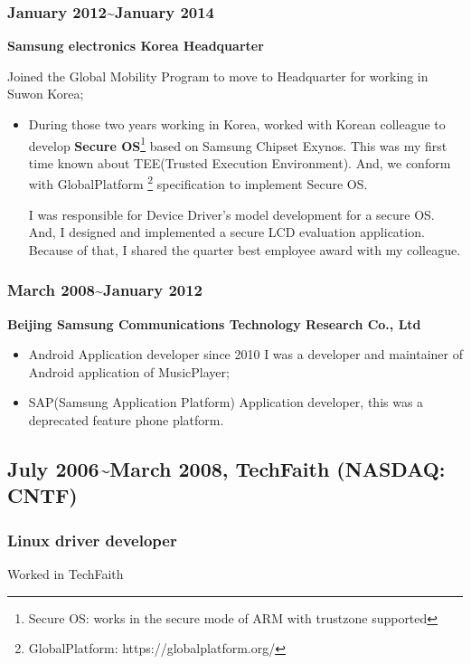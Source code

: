 \documentclass{article}
\begin{document}
\subsubsection{January 2012\~{}January 2014}
\textbf{Samsung electronics Korea Headquarter}

Joined the Global Mobility Program to move to Headquarter for working in Suwon Korea;

\begin{itemize}
\item{}During those two years working in Korea, worked with Korean colleague to develop
\textbf{Secure OS}\footnote{Secure OS: works in the secure mode of ARM with trustzone supported} based on Samsung Chipset Exynos.
This was my first time known about TEE(Trusted Execution Environment).
And, we conform with GlobalPlatform {\footnote {GlobalPlatform: https://globalplatform.org/}} specification to implement Secure OS.

I was responsible for Device Driver's model development for a secure OS. And, I designed and implemented a secure LCD evaluation application. Because of that, I shared the quarter best employee award with my colleague.

\end{itemize}

\subsubsection{March 2008\~{}January 2012}
\textbf{Beijing Samsung Communications Technology Research Co., Ltd}

\begin{itemize}
\item{Android Application developer} since 2010
I was a developer and maintainer of Android application of MusicPlayer;

\item{SAP(Samsung Application Platform) Application developer}, this was a deprecated feature phone platform.
\end{itemize}

\subsection{July 2006\~{}March 2008, TechFaith (NASDAQ: CNTF)}
\subsubsection{Linux driver developer} Worked in TechFaith
\end{document}
